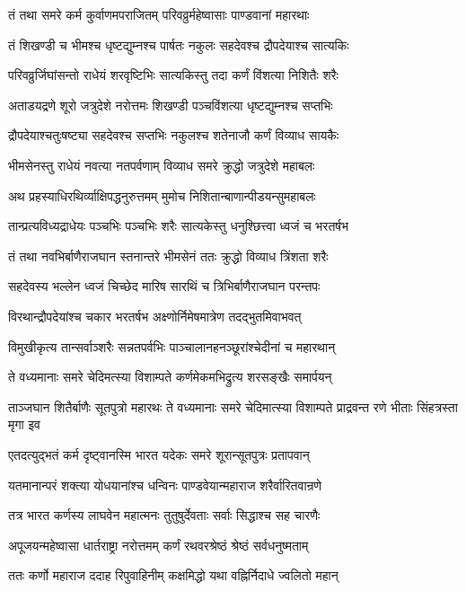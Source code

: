 \twolineshloka
{तं तथा समरे कर्म कुर्वाणमपराजितम्}
{परिवव्रुर्महेष्वासाः पाण्डवानां महारथाः}


\twolineshloka
{तं शिखण्डी च भीमश्च धृष्टद्युम्नश्च पार्षतः}
{नकुलः सहदेवश्च द्रौपदेयाश्च सात्यकिः}


\twolineshloka
{परिवव्रुर्जिघांसन्तो राधेयं शरवृष्टिभिः}
{सात्यकिस्तु तदा कर्णं विंशत्या निशितैः शरैः}


\twolineshloka
{अताडयद्रणे शूरो जत्रुदेशे नरोत्तमः}
{शिखण्डी पञ्चविंशत्या धृष्टद्युम्नश्च सप्तभिः}


\twolineshloka
{द्रौपदेयाश्चतुःषष्ट्या सहदेवश्च सप्तभिः}
{नकुलश्च शतेनाजौ कर्णं विव्याध सायकैः}


\twolineshloka
{भीमसेनस्तु राधेयं नवत्या नतपर्वणाम्}
{विव्याध समरे क्रुद्धो जत्रुदेशे महाबलः}


\twolineshloka
{अथ प्रहस्याधिरथिर्व्याक्षिपद्धनुरुत्तमम्}
{मुमोच निशितान्बाणान्पीडयन्सुमहाबलः}


\twolineshloka
{तान्प्रत्यविध्यद्राधेयः पञ्चभिः पञ्चभिः शरैः}
{सात्यकेस्तु धनुश्छित्त्वा ध्वजं च भरतर्षभ}


\twolineshloka
{तं तथा नवभिर्बाणैराजघान स्तनान्तरे}
{भीमसेनं ततः क्रुद्धो विव्याध त्रिंशता शरैः}


\twolineshloka
{सहदेवस्य भल्लेन ध्वजं चिच्छेद मारिष}
{सारथिं च त्रिभिर्बाणैराजघान परन्तपः}


\twolineshloka
{विरथान्द्रौपदेयांश्च चकार भरतर्षभ}
{अक्ष्णोर्निमेषमात्रेण तदद्भुतमिवाभवत्}


\twolineshloka
{विमुखीकृत्य तान्सर्वाञ्शरैः सन्नतपर्वभिः}
{पाञ्चालानहनञ्छूरांश्चेदीनां च महारथान्}


\twolineshloka
{ते वध्यमानाः समरे चेदिमत्स्या विशाम्पते}
{कर्णमेकमभिद्रुत्य शरसङ्खैः समार्पयन्}


\threelineshloka
{ताञ्जघान शितैर्बाणैः सूतपुत्रो महारथः}
{ते वध्यमानाः समरे चेदिमात्स्या विशाम्पते}
{प्राद्रवन्त रणे भीताः सिंहत्रस्ता मृगा इव}


\twolineshloka
{एतदत्युद्भतं कर्म दृष्ट्वानस्मि भारत}
{यदेकः समरे शूरान्सूतपुत्रः प्रतापवान्}


\twolineshloka
{यतमानान्परं शक्त्या योधयानांश्च धन्विनः}
{पाण्डवेयान्महाराज शरैर्वारितवान्रणे}


\twolineshloka
{तत्र भारत कर्णस्य लाघवेन महात्मनः}
{तुतुषुर्देवताः सर्वाः सिद्धाश्च सह चारणैः}


\twolineshloka
{अपूजयन्महेष्वासा धार्तराष्ट्रा नरोत्तमम्}
{कर्णं रथवरश्रेष्ठं श्रेष्ठं सर्वधनुष्मताम्}


\twolineshloka
{ततः कर्णो महाराज ददाह रिपुवाहिनीम्}
{कक्षमिद्धो यथा वह्निर्निदाधे ज्वलितो महान्}


